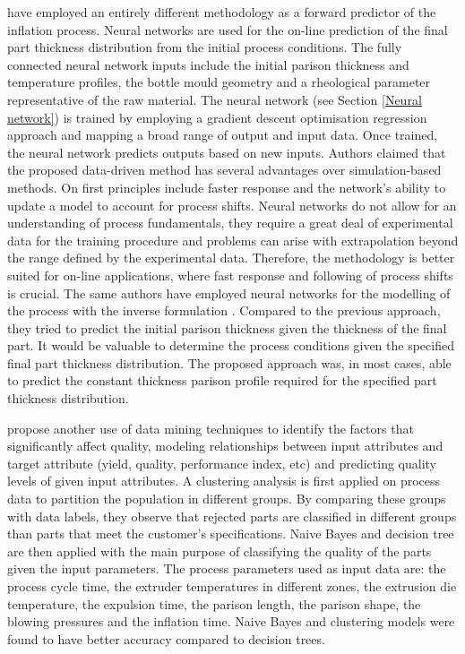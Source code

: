 \citet{diraddo1993line} have employed an entirely different methodology as a forward predictor of the inflation process. Neural networks are used for the on-line prediction of the final part thickness distribution from the initial process conditions. The fully connected neural network inputs include the initial parison thickness and temperature profiles, the bottle mould geometry and a rheological parameter representative of the raw material. The neural network (see Section \ref{Neural network}) is trained by employing a gradient descent optimisation regression approach and mapping a broad range of output and input data. Once trained, the neural network predicts outputs based on new inputs. Authors claimed that the proposed data-driven method has several advantages over simulation-based methods. On first principles include faster response and the network’s ability to update a model to account for process shifts. Neural networks do not allow for an understanding of process fundamentals, they require a great deal of experimental data for the training procedure and problems can arise with extrapolation beyond the range defined by the experimental data. Therefore, the methodology is better suited for on-line applications, where fast response and following of process shifts is crucial. The same authors have employed neural networks for the modelling of the process with the inverse formulation \citep{diraddo1993modeling}. Compared to the previous approach, they tried to predict the initial parison thickness given the thickness of the final part. It would be valuable to determine the process conditions given the specified final part thickness distribution. The proposed approach was, in most cases, able to predict the constant thickness parison profile required for the specified part thickness distribution.   

\citet{ramana2013data} propose another use of data mining techniques to identify the factors that significantly affect quality, modeling relationships between input attributes and target attribute (yield, quality, performance index, etc) and predicting quality levels of given input attributes. A clustering analysis is first applied on process data to partition the population in different groups. By comparing these groups with data labels, they observe that rejected parts are classified in different groups than parts that meet the customer's specifications. Naive Bayes and decision tree are then applied with the main purpose of classifying the quality of the parts given the input parameters. The process parameters used as input data are: the process cycle time, the extruder temperatures in different zones, the extrusion die temperature, the expulsion time, the parison length, the parison shape, the blowing pressures and the inflation time. Naive Bayes and clustering models were found to have better accuracy compared to decision trees. 


